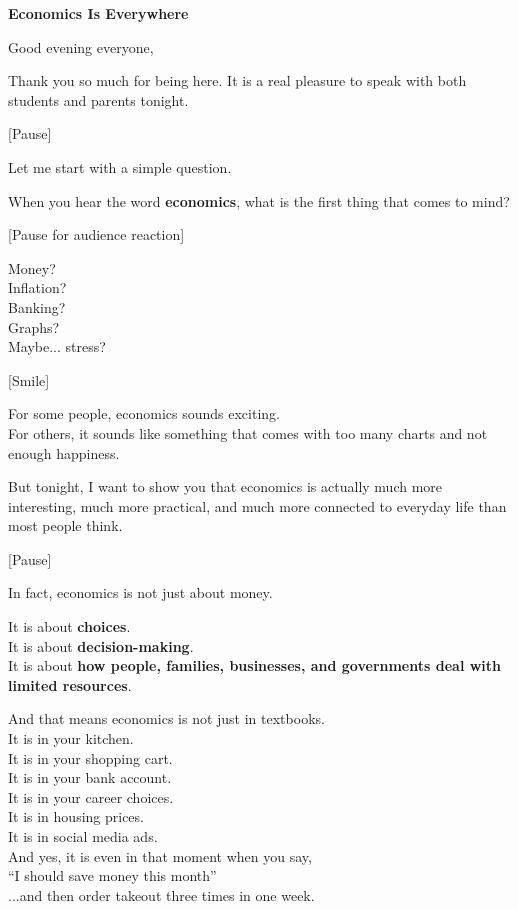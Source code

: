 \documentclass[12pt]{article}
\begin{document}
\begin{center}
    {\LARGE \textbf{Economics Is Everywhere}}\\[0.5em]
  
\end{center}

Good evening everyone,

Thank you so much for being here. It is a real pleasure to speak with both students and parents tonight.

[Pause]

Let me start with a simple question.

When you hear the word \textbf{economics}, what is the first thing that comes to mind?

[Pause for audience reaction]

Money?\\
Inflation?\\
Banking?\\
Graphs?\\
Maybe... stress?

[Smile]

For some people, economics sounds exciting.\\
For others, it sounds like something that comes with too many charts and not enough happiness.

But tonight, I want to show you that economics is actually much more interesting, much more practical, and much more connected to everyday life than most people think.

[Pause]

In fact, economics is not just about money.

It is about \textbf{choices}.\\
It is about \textbf{decision-making}.\\
It is about \textbf{how people, families, businesses, and governments deal with limited resources}.

And that means economics is not just in textbooks.\\
It is in your kitchen.\\
It is in your shopping cart.\\
It is in your bank account.\\
It is in your career choices.\\
It is in housing prices.\\
It is in social media ads.\\
And yes, it is even in that moment when you say,\\
“I should save money this month”\\
...and then order takeout three times in one week.
\end{document}
